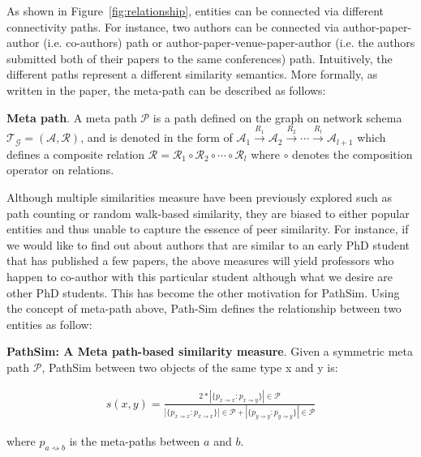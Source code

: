 As shown in Figure~\ref{fig:relationship}, entities can be connected via
different connectivity paths. For instance, two authors can be connected via
author-paper-author (i.e. co-authors) path or author-paper-venue-paper-author
(i.e.  the authors submitted both of their papers to the same conferences)
path. Intuitively, the different paths represent a different similarity
semantics. More formally, as written in the paper, the meta-path can be
described as follows:

\begin{Def}
\label{meta-path}
\textbf{Meta path}. A meta path $\mathcal{P}$ is a path defined on the graph on
network schema $\mathcal{T_G} = \mathcal{(A, R)}$, and is denoted in the form
of $\mathcal{A}_1 \xrightarrow{R_1} \mathcal{A}_2 \xrightarrow{R_2} \cdots
\xrightarrow{R_l} \mathcal{A}_{l + 1}$ which defines a composite relation
$\mathcal{R} = \mathcal{R}_1 \circ \mathcal{R}_2 \circ \cdots \circ
\mathcal{R}_l$ where $\circ$ denotes the composition operator on relations. \newline
\end{Def}

Although multiple similarities measure have been previously explored such as
path counting or random walk-based similarity, they are biased to either
popular entities and thus unable to capture the essence of peer similarity.
For instance, if we would like to find out about authors that are similar to
an early PhD student that has published a few papers, the above measures
will yield professors who happen to co-author with this particular student
although what we desire are other PhD students. This has become the other
motivation for PathSim. Using the concept of meta-path above, Path-Sim
defines the relationship between two entities as follow: \newline

\begin{Def}
\label{path-sim}
\textbf{PathSim: A Meta path-based similarity measure}. Given a symmetric
meta path $\mathcal{P}$, PathSim between two objects of the same type
x and y is:

\begin{align*}
s(x,y)=\frac{2*|\{p_{x \rightsquigarrow x}:p_{x \rightsquigarrow y}\}|\in\mathcal{P}}
{|\{p_{x \rightsquigarrow x}:p_{x \rightsquigarrow x}\}|\in\mathcal{P} +
|\{p_{y \rightsquigarrow y}:p_{y \rightsquigarrow y}\}|\in\mathcal{P}}
\end{align*}

where $p_{a \rightsquigarrow b}$ is the meta-paths between $a$ and $b$. \newline
\end{Def}

